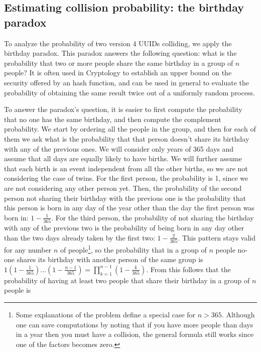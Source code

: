 \documentclass{report}
\begin{document}
\subsection{Estimating collision probability: the birthday paradox}
To analyze the probability of two version 4 UUIDs colliding, we apply the birthday paradox. 
This paradox answers the following question: what is the probability that two or more people share the same birthday in a group of $n$ people? It is often used in Cryptology to
establish an upper bound on the security offered by an hash function, and can be used in general to evaluate the probability of obtaining the same result twice out of a uniformly random
process. \par
To answer the paradox's question, it is easier to first compute the probability that no one has the same birthday, and then compute the complement probability. We start by ordering all 
the people in the group, and then for each of them we ask what is the probability that that person doesn't share its birthday with any of the previous ones. We will consider only years
of 365 days and assume that all days are equally likely to have births. We will further assume that each birth is an event independent from all the other births, so we are not
considering the case of twins. For the first person, the
probability is 1, since we are not considering any other person yet. Then, the probability of the second person not sharing their birthday with the previous one is the probability
that this person is born in any day of the year other than the day the first person was born in: $1-\frac{1}{365}$. For the third person, the probability of not sharing the
birthday with any of the previous two is the probability of being born in any day other than the two days already taken by the first two: $1-\frac{2}{365}$. This pattern stays
valid for any number $n$ of people\footnote{Some explanations of the problem define a special case for $n>365$. Although one can save computations by noting that if you have more
people than days in a year then you must have a collision, the general formula still works since one of the factors becomes zero.}, so the probability that in a group of $n$ people no-one shares its birthday with another person of the same group is $1(1 - \frac{1}{365} ) \dotso  (1 - \frac{n - 1}{365} ) = \prod_{k=1}^{n-1}(1-\frac{k}{365})$. From this follows that 
the probability of having at least two people that share their birthday in a group of $n$ people is
\end{document}
